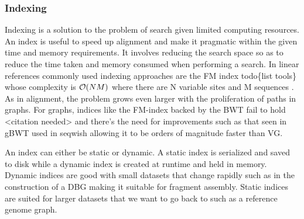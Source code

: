 \documentclass[a4paper]{article}
\begin{document}
\subsubsection{Indexing}
\label{sec:org20c9668}
Indexing is a solution to the problem of search given limited computing
resources. An index is useful to speed up alignment and make it pragmatic within
the given time and memory requirements. 
It involves reducing the search space so as to reduce the time taken and memory
consumed when performing a search.
In linear references commonly used indexing approaches are the FM index 
todo\{list tools\} whose complexity is \(\mathcal{O}(NM)\) where there are N variable
sites and M sequences \cite{durbinEfficientHaplotypeMatching2014}.
As in alignment, the problem grows even larger with the proliferation of paths 
in graphs. For graphs, indices like the FM-index backed by the BWT fail to hold
<citation needed> and there’s the need for improvements such as that seen in
gBWT used in seqwish allowing it to be orders of magnitude faster than VG.

An index can either be static or dynamic. A static index is serialized and saved
to disk while a dynamic index is created at runtime and held in memory. Dynamic
indices are good with small datasets that change rapidly such as in the
construction of a DBG making it suitable for fragment assembly. Static indices 
are suited for larger datasets that we want to go back to such as a reference
genome graph.
\end{document}

